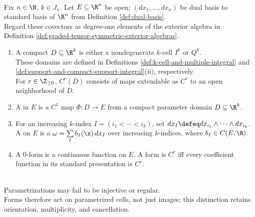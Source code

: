 \begin{definition} \label{def:k-surfaces-and-differential-forms} \\
Fix $n\in\N$, $k\in J_n$. Let $E\subseteq\R^n$ be open; $(dx_1,\ldots,dx_n)$ be dual basis to standard basis of $\R^n$ from Definition \ref{def:dual-basis}.\\
Regard these covectors as degree-one elements of the exterior algebra in Definition \ref{def:graded-tensor-symmetric-exterior-algebras}.
\begin{enumerate}[label=(\roman*)]
\setlength{\itemsep}{0pt}
\item A compact  $D\subseteq\R^k$ is either a nondegenerate $k$-cell $I^k$ or $Q^k$.\\
These domains are defined in Definitions \ref{def:k-cell-and-multiple-integral} and \ref{def:support-and-compact-support-integral}(ii), respectively.\\
For $r\in\Z_{\geq0}$, $C^r(D)$ consists of maps extendable as $C^r$ to an open neighborhood of $D$.
\item A  in $E$ is a $C^1$ map $\Phi:D\to E$ from a compact parameter domain $D\subseteq\R^k$.
\item For an increasing $k$-index $I=(i_1<\cdots<i_k)$, set $dx_I\defeq dx_{i_1}\wedge\cdots\wedge dx_{i_k}$.\\
A  on $E$ is a  $\omega=\sum\limits_I b_I(\x)\,dx_I$ over increasing $k$-indices, where $b_I\in C(E,\R)$.
\item A $0$-form is a continuous function on $E$. A form is $C^r$ iff every coefficient function in its standard presentation is $C^r$.
\end{enumerate}
\end{definition}

\begin{remark} \label{rem:parametrized-cells-not-images} \\
Parametrizations may fail to be injective or regular.\\
Forms therefore act on parametrized cells, not just images; this distinction retains orientation, multiplicity, and cancellation.
\end{remark}

